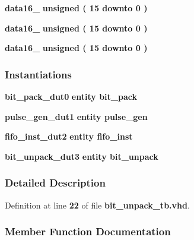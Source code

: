 \begin{DoxyCompactItemize}
\item 
{\bf data16\+\_} {\bfseries \textcolor{comment}{unsigned}\textcolor{vhdlchar}{ }\textcolor{vhdlchar}{(}\textcolor{vhdlchar}{ }\textcolor{vhdlchar}{ } \textcolor{vhdldigit}{15} \textcolor{vhdlchar}{ }\textcolor{keywordflow}{downto}\textcolor{vhdlchar}{ }\textcolor{vhdlchar}{ } \textcolor{vhdldigit}{0} \textcolor{vhdlchar}{ }\textcolor{vhdlchar}{)}\textcolor{vhdlchar}{ }} 
\item 
{\bf data16\+\_} {\bfseries \textcolor{comment}{unsigned}\textcolor{vhdlchar}{ }\textcolor{vhdlchar}{(}\textcolor{vhdlchar}{ }\textcolor{vhdlchar}{ } \textcolor{vhdldigit}{15} \textcolor{vhdlchar}{ }\textcolor{keywordflow}{downto}\textcolor{vhdlchar}{ }\textcolor{vhdlchar}{ } \textcolor{vhdldigit}{0} \textcolor{vhdlchar}{ }\textcolor{vhdlchar}{)}\textcolor{vhdlchar}{ }} 
\item 
{\bf data16\+\_} {\bfseries \textcolor{comment}{unsigned}\textcolor{vhdlchar}{ }\textcolor{vhdlchar}{(}\textcolor{vhdlchar}{ }\textcolor{vhdlchar}{ } \textcolor{vhdldigit}{15} \textcolor{vhdlchar}{ }\textcolor{keywordflow}{downto}\textcolor{vhdlchar}{ }\textcolor{vhdlchar}{ } \textcolor{vhdldigit}{0} \textcolor{vhdlchar}{ }\textcolor{vhdlchar}{)}\textcolor{vhdlchar}{ }} 
\end{DoxyCompactItemize}
\subsubsection*{Instantiations}
 \begin{DoxyCompactItemize}
\item 
{\bf bit\+\_\+pack\+\_\+dut0}  {\bfseries entity bit\+\_\+pack}   
\item 
{\bf pulse\+\_\+gen\+\_\+dut1}  {\bfseries entity pulse\+\_\+gen}   
\item 
{\bf fifo\+\_\+inst\+\_\+dut2}  {\bfseries entity fifo\+\_\+inst}   
\item 
{\bf bit\+\_\+unpack\+\_\+dut3}  {\bfseries entity bit\+\_\+unpack}   
\end{DoxyCompactItemize}


\subsubsection{Detailed Description}


Definition at line {\bf 22} of file {\bf bit\+\_\+unpack\+\_\+tb.\+vhd}.



\subsubsection{Member Function Documentation}
